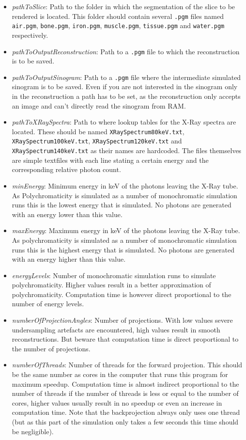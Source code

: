 \begin{itemize}
	\item\emph{pathToSlice}: Path to the folder in which the segmentation of the slice to be rendered is located. This folder should contain several \verb!.pgm! files named \verb!air.pgm!, \verb!bone.pgm!, \verb!iron.pgm!, \verb!muscle.pgm!, \verb!tissue.pgm! and \verb!water.pgm! respectively.
	\item\emph{pathToOutputReconstruction}: Path to a \verb!.pgm! file to which the reconstruction is to be saved.
	\item\emph{pathToOutputSinogram}: Path to a \verb!.pgm! file where the intermediate simulated sinogram is to be saved. Even if you are not interested in the sinogram only in the reconstruction a path has to be set, as the reconstruction only accepts an image and can't directly read the sinogram from RAM.
	\item\emph{pathToXRaySpectra}: Path to where lookup tables for the X-Ray spectra are located. These should be named \verb!XRaySpectrum80keV.txt!, \verb!XRaySpectrum100keV.txt!, \verb!XRaySpectrum120keV.txt! and \verb!XRaySpectrum140keV.txt! as their names are hardcoded. The files themselves are simple textfiles with each line stating a certain energy and the corresponding relative photon count.
	\item\emph{minEnergy}: Minimum energy in keV of the photons leaving the X-Ray tube. As Polychromaticity is simulated as a number of monochromatic simulation runs this is the lowest energy that is simulated. No photons are generated with an energy lower than this value.
	\item\emph{maxEnergy}: Maximum energy in keV of the photons leaving the X-Ray tube. As polychromaticity is simulated as a number of monochromatic simulation runs this is the highest energy that is simulated. No photons are generated with an energy higher than this value.
	\item\emph{energyLevels}: Number of monochromatic simulation runs to simulate polychromaticity. Higher values result in a better approximation of polychromaticity. Computation time is however direct proportional to the number of energy levels.
	\item\emph{numberOfProjectionAngles}: Number of projections. With low values severe undersampling artefacts are encountered, high values result in smooth reconstructions. But beware that computation time is direct proportional to the number of projections.
	\item\emph{numberOfThreads}: Number of threads for the forward projection. This should be the same number as cores in the computer that runs this program for maximum speedup. Computation time is almost indirect proportional to the number of threads if the number of threads is less or equal to the number of cores, higher values usually result in no speedup or even an increase in computation time. Note that the backprojection always only uses one thread (but as this part of the simulation only takes a few seconds this time should be negligible).

\end{itemize}
